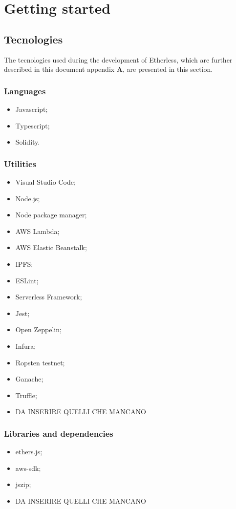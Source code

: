 \section{Getting started}
\subsection{Tecnologies}
The tecnologies used during the development of Etherless, which are further described in this document appendix \textbf{A}, are presented in this section.
\subsubsection{Languages}
\begin{itemize}
	\item Javascript;
	\item Typescript;
	\item Solidity.
\end{itemize}
\subsubsection{Utilities}
\begin{itemize}
	\item Visual Studio Code;
	\item Node.js;
	\item Node package manager;
	\item AWS Lambda;
	\item AWS Elastic Beanstalk;
	\item IPFS;
	\item ESLint;
	\item Serverless Framework;
	\item Jest;
	\item Open Zeppelin;
	\item Infura;
	\item Ropsten testnet;
	\item Ganache;
	\item Truffle;
	\item DA INSERIRE QUELLI CHE MANCANO
\end{itemize}
\subsubsection{Libraries and dependencies}
\begin{itemize}
	\item ethers.js;
	\item aws-sdk;
	\item jszip;
	\item DA INSERIRE QUELLI CHE MANCANO
\end{itemize}
